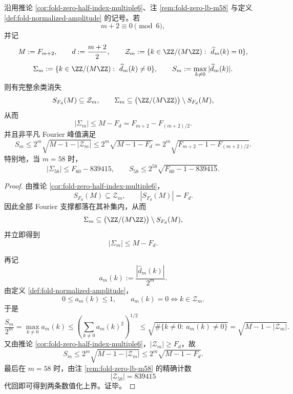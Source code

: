 \begin{theorem}[六倍窗完整余类零块与非平凡谱峰抑制]\label{thm:xi-window6-full-coset-zero-block-peak-suppression}
沿用推论 \ref{cor:fold-zero-half-index-multiple6}、注 \ref{rem:fold-zero-lb-m58} 与定义 \ref{def:fold-normalized-amplitude} 的记号。若
\[
m+2\equiv 0\pmod 6,
\]
并记
\[
M:=F_{m+2},
\qquad
d:=\frac{m+2}{2},
\qquad
\mathcal Z_m:=\{k\in \ZZ/(M\ZZ):\ \widehat d_m(k)=0\},
\]
\[
\Sigma_m:=\{k\in \ZZ/(M\ZZ):\ \widehat d_m(k)\neq 0\},
\qquad
S_m:=\max_{k\ne 0}|\widehat d_m(k)|.
\]
则有完整余类消失
\[
S_{F_d}(M)\subseteq \mathcal Z_m,
\qquad
\Sigma_m\subseteq \bigl(\ZZ/(M\ZZ)\bigr)\setminus S_{F_d}(M),
\]
从而
\[
\boxed{\;
|\Sigma_m|
\le
M-F_d
=
F_{m+2}-F_{(m+2)/2}.\;}
\]
并且非平凡 Fourier 峰值满足
\[
\boxed{\;
S_m
\le
2^m\sqrt{M-1-|\mathcal Z_m|}
\le
2^m\sqrt{M-1-F_d}
=
2^m\sqrt{F_{m+2}-1-F_{(m+2)/2}}.\;}
\]
特别地，当 \(m=58\) 时，
\[
\boxed{\;
|\Sigma_{58}|
\le
F_{60}-839415,
\qquad
S_{58}
\le
2^{58}\sqrt{F_{60}-1-839415}.\;}
\]
\end{theorem}
\begin{proof}
由推论 \ref{cor:fold-zero-half-index-multiple6}，
\[
S_{F_d}(M)\subseteq \mathcal Z_m,
\qquad
|S_{F_d}(M)|=F_d.
\]
因此全部 Fourier 支撑都落在其补集内，从而
\[
\Sigma_m\subseteq \bigl(\ZZ/(M\ZZ)\bigr)\setminus S_{F_d}(M),
\]
并立即得到
\[
|\Sigma_m|\le M-F_d.
\]

再记
\[
a_m(k):=\frac{|\widehat d_m(k)|}{2^m}.
\]
由定义 \ref{def:fold-normalized-amplitude}，
\[
0\le a_m(k)\le 1,
\qquad
a_m(k)=0\iff k\in\mathcal Z_m.
\]
于是
\[
\frac{S_m}{2^m}=\max_{k\ne 0}a_m(k)
\le
\left(\sum_{k\ne 0}a_m(k)^2\right)^{1/2}
\le
\sqrt{\#\{k\ne 0:\ a_m(k)\ne 0\}}
=
\sqrt{M-1-|\mathcal Z_m|}.
\]
又由推论 \ref{cor:fold-zero-half-index-multiple6}，\(|\mathcal Z_m|\ge F_d\)，故
\[
S_m\le 2^m\sqrt{M-1-|\mathcal Z_m|}
\le
2^m\sqrt{M-1-F_d}.
\]
最后在 \(m=58\) 时，由注 \ref{rem:fold-zero-lb-m58} 的精确计数
\[
|\mathcal Z_{58}|=839415
\]
代回即可得到两条数值化上界。证毕。
\end{proof}



\endinput
